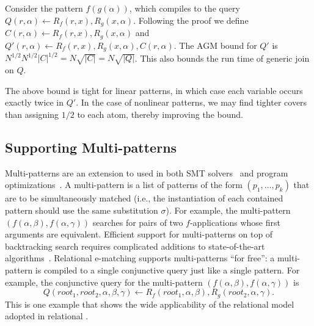 \begin{example}
  Consider the pattern $f(g(\alpha))$,
   which compiles to the query $Q(r, \alpha) \gets R_{f}(r, x), R_{g}(x, \alpha)$.
  Following the proof we define $C(r,\alpha) \gets R_{f}(r,x), R_{g}(x,\alpha)$
   and
   $Q'(r, \alpha) \gets R_{f}(r, x), R_{g}(x, \alpha), C(r, \alpha)$.
  The AGM bound for $Q'$ is $N^{1/2}N^{1/2}|C|^{1/2} = N\sqrt{|C|} = N\sqrt{|Q|}$.
  This also bounds the run time of generic join on $Q$.
\end{example}

The above bound is tight for linear patterns,
 in which case each variable occurs exactly twice in $Q'$.
In the case of nonlinear patterns,
 we may find tighter covers than assigning $1/2$ to each atom,
 thereby improving the bound.

\subsection{Supporting Multi-patterns}

Multi-patterns are an extension to \ematching used in both
 SMT solvers~\cite{efficient-ematching}
 and program optimizations~\cite{tensat}.
A multi-pattern is a list of patterns of the form $(p_1, \ldots, p_k)$
 that are to be simultaneously matched (i.e., the instantiation of each contained pattern
should use the same substitution $\sigma$).
For example, \ematching the multi-pattern
 $(f(\alpha, \beta), f(\alpha, \gamma))$ searches for pairs of two $f$-applications
 whose first arguments are equivalent.
Efficient support for multi-patterns
 on top of backtracking search requires complicated additions
 to state-of-the-art \ematching algorithms~\cite{efficient-ematching}.
Relational e-matching supports multi-patterns
 ``for free'':
 a multi-pattern is compiled to a single
 conjunctive query just like a single pattern.
For example, the conjunctive query for the
 multi-pattern $(f(\alpha, \beta), f(\alpha, \gamma))$ is
\begin{equation}
  Q(\textit{root}_1,\textit{root}_2,\alpha,\beta, \gamma)\gets
  R_f(\textit{root}_1,\alpha,\beta), R_g(\textit{root}_2, \alpha, \gamma).
\end{equation}
This is one example that shows the wide applicability of the relational
 model adopted in relational \ematching.


